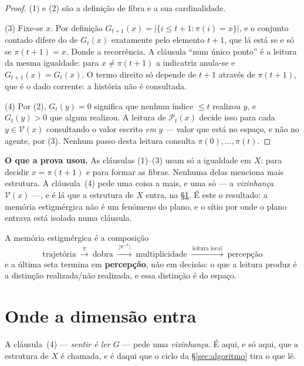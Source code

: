 \documentclass[11pt,a4paper]{article}
\begin{document}
\begin{proof}
(1) e (2) são a definição de fibra e a sua cardinalidade.

(3) Fixe-se $x$. Por definição $G_{t+1}(x)=\lvert\{i\le t+1:\pi(i)=x\}\rvert$, e
o conjunto contado difere do de $G_t(x)$ exatamente pelo elemento $t+1$, que lá
está se e só se $\pi(t+1)=x$. Donde a recorrência. A cláusula ``num único ponto''
é a leitura da mesma igualdade: para $x\neq\pi(t+1)$ a indicatriz anula-se e
$G_{t+1}(x)=G_t(x)$. O termo direito só depende de $t+1$ através de $\pi(t+1)$,
que é o dado corrente: a história não é consultada.

(4) Por (2), $G_t(y)=0$ significa que nenhum índice $\le t$ realizou $y$, e
$G_t(y)>0$ que algum realizou. A leitura de $\mathcal{P}_t(x)$ decide isso para
cada $y\in \mathcal{V}(x)$ consultando o valor escrito \emph{em} $y$ --- valor que está no
espaço, e não no agente, por (3). Nenhum passo desta leitura consulta
$\pi(0),\dots,\pi(t)$.
\end{proof}



\medskip\noindent\textbf{O que a prova usou.} As cláusulas (1)--(3) usam só a
igualdade em $X$: para decidir $x=\pi(t+1)$ e para formar as fibras. Nenhuma
delas menciona mais estrutura. A cláusula~(4) pede uma coisa a mais, e uma só
--- a \emph{vizinhança} $\mathcal{V}(x)$ ---, e é lá que a estrutura de $X$ entra, na
§\ref{sec:dimensao}. É este o resultado: a memória estigmérgica não é um
fenómeno do plano, e o sítio por onde o plano entrava está isolado numa
cláusula.

\medskip\noindent A memória estigmérgica é a composição
\[
\boxed{\ \text{trajetória}\ \xrightarrow{\ \pi\ }\ \text{dobra}\
\xrightarrow{\ \lvert\pi^{-1}\rvert\ }\ \text{multiplicidade}\
\xrightarrow{\ \text{leitura local}\ }\ \text{percepção}\ }
\]
e a última seta termina em \textbf{percepção}, não em decisão: o que a leitura
produz é a distinção realizada/não realizada, e essa distinção é do espaço.

\section{Onde a dimensão entra}\label{sec:dimensao}

\noindent A cláusula~(4) --- \emph{sentir é ler $G$} --- pede uma
\emph{vizinhança}. É aqui, e só aqui, que a estrutura de $X$ é chamada, e é daqui
que o ciclo da §\ref{sec:algoritmo} tira o que lê.
\end{document}
